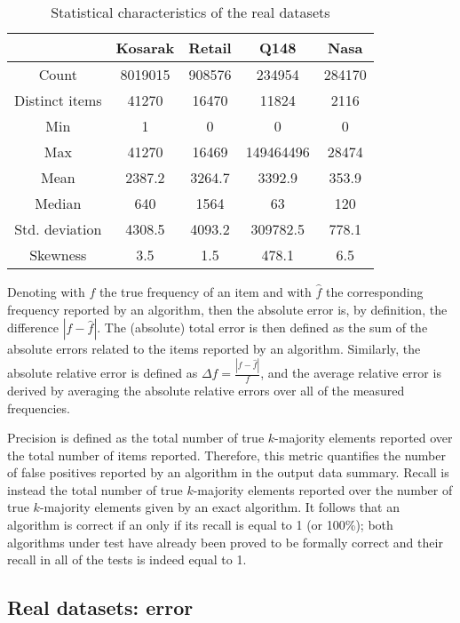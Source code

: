 \documentclass[final,3p,times]{elsarticle}
\begin{document}
\begin{table}
\renewcommand{\arraystretch}{1.3}
 \caption{Statistical characteristics of the real datasets}
      \label{data}
	\centering
    \begin{tabular}{|c |  c |  c  | c | c |}
    \hline
      & Kosarak & Retail & Q148 & Nasa  \\ \hline
      \hline
    Count &  8019015 & 908576 & 234954 & 284170 \\ \hline
    Distinct items & 41270 & 16470 & 11824 & 2116 \\ \hline
    Min & 1 & 0 & 0 &  0  \\ \hline 
    Max & 41270 & 16469 & 149464496 & 28474 \\ \hline 
    Mean & 2387.2 & 3264.7 & 3392.9 & 353.9  \\ \hline
    Median & 640 & 1564 & 63 & 120 \\ \hline
    Std. deviation & 4308.5 & 4093.2 & 309782.5 & 778.1 \\ \hline
    Skewness & 3.5 & 1.5 & 478.1 & 6.5  \\ \hline
    \end{tabular}
    \end{table}

Denoting with $f$  the true frequency of an item and with $\hat{f}$ the corresponding frequency reported by an algorithm, then the absolute error is, by definition, the difference $\left|  f - \hat{f} \right|$. The (absolute) total error is then defined as the sum of the absolute errors related to the items reported by an algorithm. Similarly, the absolute relative error is defined as $\Delta f = \frac{{\left| {f - \hat{f}} \right|}}{f}$, and the average relative error is derived by averaging the absolute relative errors over all of the measured frequencies.

Precision is defined as the total number of true $k$-majority elements reported over the total number of items reported. Therefore, this metric quantifies the number of false positives reported by an algorithm in the output data summary. Recall is instead the total number of true $k$-majority elements reported over the number of true $k$-majority elements given by an exact algorithm. It follows that an algorithm is correct if an only if its recall is equal to 1 (or 100\%); both algorithms under test have already been proved to be formally correct and their recall in all of the tests is indeed equal to 1.

\subsection{Real datasets: error}
\end{document}
